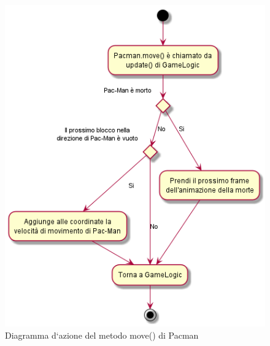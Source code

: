 \documentclass[12pt,a4paper]{report}
\begin{document}
\begin{figure}[tbp]
\centering
 \includegraphics[width=\textwidth,height=0.4\textheight,keepaspectratio]{pacman_move}
  \caption{Diagramma d`azione del metodo move() di Pacman}
  \label{fig:pacman_move}
\vspace*{\floatsep}

\end{figure}
\end{document}
